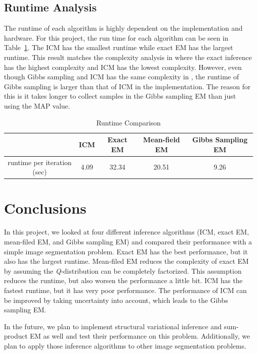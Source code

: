 \documentclass{article} %
\begin{document}
\subsection{Runtime Analysis}
\label{runtime}
The runtime of each algorithm is highly dependent on the implementation and hardware. For this project, the run time for each algorithm can be seen in Table~\ref{tab:runtime}. The ICM has the smallest runtime while exact EM has the largest runtime. This result matches the complexity analysis in \cite{b2} where the exact inference has the highest complexity and ICM has the lowest complexity. However, even though Gibbs sampling and ICM has the same complexity in \cite{b2}, the runtime of Gibbs sampling is larger than that of ICM in the implementation. The reason for this is it takes longer to collect samples in the Gibbs sampling EM than just using the MAP value.

\begin{table}[h]
\centering
\caption{Runtime Comparison}
\label{tab:runtime}
\begin{tabular}{|c|c|c|c|c|}
\hline
& ICM & Exact EM & Mean-field EM & Gibbs Sampling EM \\ \hline
runtime per iteration (sec) & 4.09 & 32.34 & 20.51 & 9.26 \\ \hline
\end{tabular}
\end{table}

\section{Conclusions}
\label{conclusion}
In this project, we looked at four different inference algorithms (ICM, exact EM, mean-filed EM, and Gibbs sampling EM) and compared their performance with a simple image segmentation problem. Exact EM has the best performance, but it also has the largest runtime. Mean-filed EM reduces the complexity of exact EM by assuming the \textit{Q}-distribution can be completely factorized. This assumption reduces the runtime, but also worsen the performance a little bit. ICM has the fastest runtime, but it has very poor performance. The performance of ICM can be improved by taking uncertainty into account, which leads to the Gibbs sampling EM.

In the future, we plan to implement structural variational inference and sum-product EM as well and test their performance on this problem. Additionally, we plan to apply those inference algorithms to other image segmentation problems.
\end{document}
